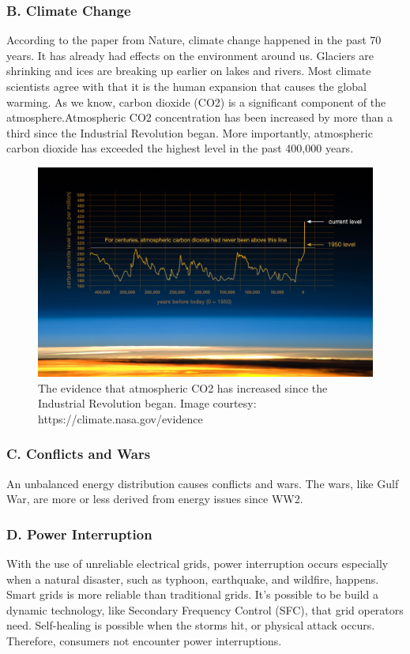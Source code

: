\documentclass{report}
\begin{document}
\subsubsection{B. Climate Change}
According to the paper from Nature, climate change happened in the past 70 years. It has already had effects on the environment around us. Glaciers are shrinking and ices are breaking up earlier on lakes and rivers. Most climate scientists agree with that it is the human expansion that causes the global warming. As we know, carbon dioxide (CO2) is a significant component of the atmosphere.Atmospheric CO2 concentration has been increased by more than a third since the Industrial Revolution began. More importantly, atmospheric carbon dioxide has exceeded the highest level in the past 400,000 years.\\

\begin{figure}[htbp]
\centering
\includegraphics[width = .891\textwidth]{figure/1_1_1_nasa_co2.jpeg}
\caption{The evidence that atmospheric CO2 has increased since the Industrial Revolution began. Image courtesy: https://climate.nasa.gov/evidence}
\label{1_1_1_nasa_co2}
\end{figure}

\subsubsection{C. Conflicts and Wars}
An unbalanced energy distribution causes conflicts and wars. The wars, like Gulf War, are more or less derived from energy issues since WW2.\\

\subsubsection{D. Power Interruption}
With the use of unreliable electrical grids, power interruption occurs especially when a natural disaster, such as typhoon, earthquake, and wildfire, happens. Smart grids is more reliable than traditional grids. It’s possible to be build a dynamic technology, like Secondary Frequency Control (SFC), that grid operators need. Self-healing is possible when the storms hit, or physical attack occurs. Therefore, consumers not encounter power interruptions.\\
\end{document}
